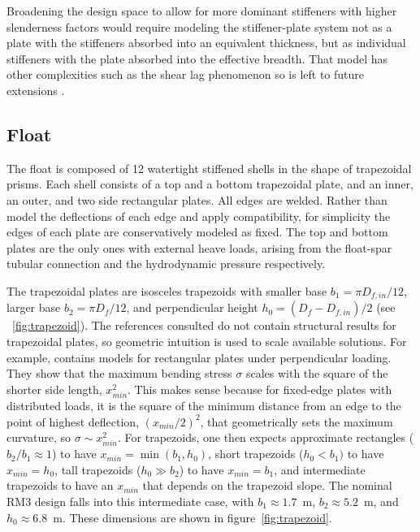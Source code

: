 Broadening the design space to allow for more dominant stiffeners with higher slenderness factors would require modeling the stiffener-plate system not as a plate with the stiffeners absorbed into an equivalent thickness, but as individual stiffeners with the plate absorbed into the effective breadth.
That model has other complexities such as the shear lag phenomenon so is left to future extensions \cite{wierzbicki_lecture_2013,american_iron_and_steel_institute_cold-formed_1991}.


\subsection{Float}
The float is composed of 12 watertight stiffened shells in the shape of trapezoidal prisms.
Each shell consists of a top and a bottom trapezoidal plate, and an inner, an outer, and two side rectangular plates.
All edges are welded.
Rather than model the deflections of each edge and apply compatibility, for simplicity the edges of each plate are conservatively modeled as fixed.
The top and bottom plates are the only ones with external heave loads, arising from the float-spar tubular connection and the hydrodynamic pressure respectively.

The trapezoidal plates are isosceles trapezoids with smaller base $b_1 = \pi D_{f,in}/12$, larger base $b_2=\pi D_f/12$, and perpendicular height $h_0=(D_f-D_{f,in})/2$ (see \figurename~\ref{fig:trapezoid}).
The references consulted do not contain structural results for trapezoidal plates, so geometric intuition is used to scale available solutions.
For example, \cite{young_roarks_2001} contains models for rectangular plates under perpendicular loading.
They show that the maximum bending stress $\sigma$ scales with the square of the shorter side length, $x_{min}^2$. %
This makes sense because for fixed-edge plates with distributed loads, it is the square of the minimum distance from an edge to the point of highest deflection, $(x_{min}/2)^2$, that geometrically sets the maximum curvature, so $\sigma\sim x_{min}^2$.
For trapezoids, one then expects approximate rectangles ($b_2/b_1\approx1$) to have $x_{min}=\min(b_1,h_0)$, short trapezoids ($h_0<b_1)$ to have $x_{min}=h_0$, tall trapezoids ($h_0\gg b_2$) to have $x_{min}=b_1$, and intermediate trapezoids to have an $x_{min}$ that depends on the trapezoid slope.
The nominal RM3 design falls into this intermediate case, with $b_1\approx1.7$~m, $b_2\approx5.2$~m, and $h_0\approx6.8$~m.
These dimensions are shown in figure~\ref{fig:trapezoid}.

